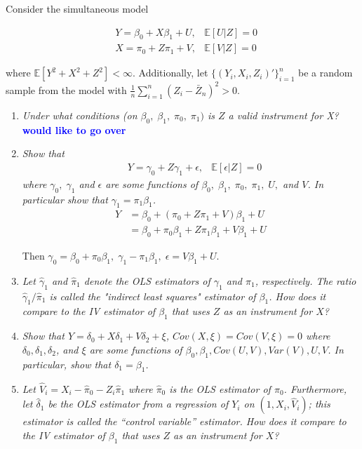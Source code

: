 \documentclass[12pt,oneside,reqno]{amsart}
\newcommand{\E}{\mathbb{E}}
\newcommand{\sumin}{\sum\limits_{i=1}^n} %
\newcommand{\fix} [1] {\textbf{\textcolor{blue}{#1}}} %
\begin{document}
Consider the simultaneous model 

\begin{align*}
& Y = \beta_0+X\beta_1 +U, &\E[U|Z]= 0 
\\
& X = \pi_0 +Z\pi_1+V, & \E[V|Z] = 0
\end{align*}

where $\E[Y^2 +X^2+Z^2]<\infty$. Additionally, let $\{(Y_i,X_i,Z_i)'\}_{i=1}^n$ be a random sample from the model with $\frac{1}{n}\sumin (Z_i-\bar{Z}_n)^2>0$. 


\begin{enumerate}[label = (\roman*)]

\item \textit{Under what conditions (on $\beta_0,\;\beta_1,\;\pi_0,\;\pi_1)$ is $Z$ a valid instrument for X?} \\
\fix{would like to go over}


\item \textit{Show that}
\begin{align*}
& Y = \gamma_0 +Z\gamma_1 +\epsilon, 
& \E[\epsilon|Z] = 0
\end{align*}
\textit{where $\gamma_0,\;\gamma_1$ and $\epsilon$ are some functions of $\beta_0,\;\beta_1,\;\pi_0,\;\pi_1,\; U,$ and $V$. In particular show that $\gamma_1 = \pi_1\beta_1$.}
\\
\begin{align*}
Y & = \beta_0 + (\pi_0 +Z\pi_1+V)\beta_1 +U \\
  & = \beta_0 +\pi_0\beta_1 +Z\pi_1\beta_1 +V\beta_1 +U 
\end{align*}

\noindent Then $\gamma_0 = \beta_0+\pi_0\beta_1,\; \gamma_1 - \pi_1\beta_1,\; \epsilon = V\beta_1 +U$.

\item \textit{Let $\hat{\gamma}_1$ and $\hat{\pi}_1$ denote the OLS estimators of $\gamma_1$ and $\pi_1$, respectively. The ratio $\hat{\gamma}_1/\hat{\pi}_1$ is called the "indirect least squares" estimator of $\beta_1$. How does it compare to the IV estimator of $\beta_1$ that uses $Z$ as an instrument for $X$?}


\item \textit{Show that $Y = \delta_0 + X \delta_1 + V \delta_2 + \xi$, $Cov(X, \xi) = Cov(V, \xi) = 0$ where $\delta_0, \delta_1, \delta_2$, and $\xi$ are some functions of $\beta_0, \beta_1, Cov(U, V), Var(V), U, V$. In particular, show that $\delta_1 = \beta_1$.}


\item \textit{Let $\hat{V}_i = X_i - \hat{\pi}_0 - Z_i \hat{\pi}_1$ where $\hat{\pi}_0$ is the OLS estimator of $\pi_0$. Furthermore, let $\hat{\delta}_1$ be the OLS estimator from a regression of $Y_i$ on $(1,X_i,\hat{V}_i)$; this estimator is called the “control variable” estimator. How does it compare to the IV estimator of $\beta_1$ that uses $Z$ as an instrument for $X$?}


\end{enumerate}
\end{document}
